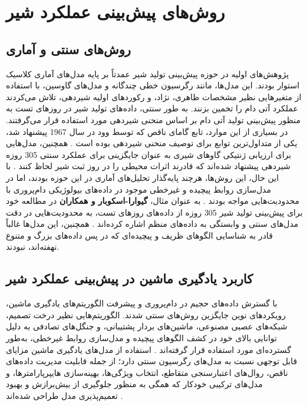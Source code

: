 \section{روش‌های پیش‌بینی عملکرد شیر}

\subsection{روش‌های سنتی و آماری}	
پژوهش‌های اولیه در حوزه پیش‌بینی تولید شیر عمدتاً بر پایه مدل‌های آماری کلاسیک استوار بودند. این مدل‌ها، مانند رگرسیون خطی چندگانه و مدل‌های گاوسین، با استفاده از متغیرهایی نظیر مشخصات ظاهری، نژاد، و رکوردهای اولیه شیردهی، تلاش می‌کردند عملکرد آتی دام را تخمین بزنند. به طور سنتی، داده‌های تولید شیر در روزهای تست به منظور پیش‌بینی تولید آتی دام بر اساس منحنی شیردهی مورد استفاده قرار می‌گرفتند. در بسیاری از این موارد، تابع گامای ناقص که توسط وود در سال 1967 پیشنهاد شد، یکی از متداول‌ترین توابع برای توصیف منحنی شیردهی بوده است \cite{Wood1967}. همچنین، مدل‌هایی برای ارزیابی ژنتیکی گاوهای شیری به عنوان جایگزینی برای عملکرد سنتی 305 روزه شیردهی پیشنهاد شده‌اند که قادرند اثرات محیطی را در روز ثبت شیر لحاظ کنند \cite{Ali1987}.
با این حال، این روش‌ها، هرچند پایه‌گذار تحلیل‌های آماری در این حوزه بودند، اما در مدل‌سازی روابط پیچیده و غیرخطی موجود در داده‌های بیولوژیکی دام‌پروری با محدودیت‌هایی مواجه بودند \cite{GuevaraEscobar2022}. به عنوان مثال، \textbf{ گیوارا-اسکوبار و همکاران} در مطالعه خود برای پیش‌بینی تولید شیر 305 روزه از داده‌های روزهای تست، به محدودیت‌هایی در دقت مدل‌های سنتی و وابستگی به داده‌های منظم اشاره کرده‌اند \cite{GuevaraEscobar2022}. همچنین، این مدل‌ها غالباً قادر به شناسایی الگوهای ظریف و پیچیده‌ای که در پس داده‌های بزرگ و متنوع نهفته‌اند، نبودند.
	
\subsection{کاربرد یادگیری ماشین در پیش‌بینی عملکرد شیر}	
با گسترش داده‌های حجیم در دام‌پروری و پیشرفت الگوریتم‌های یادگیری ماشین، رویکردهای نوین جایگزین روش‌های سنتی شدند. الگوریتم‌هایی نظیر درخت تصمیم، شبکه‌های عصبی مصنوعی، ماشین‌های بردار پشتیبانی، و جنگل‌های تصادفی به دلیل توانایی بالای خود در کشف الگوهای پیچیده و مدل‌سازی روابط غیرخطی، به‌طور گسترده‌ای مورد استفاده قرار گرفته‌اند \cite{GuevaraEscobar2022}. استفاده از مدل‌های یادگیری ماشین مزایای قابل توجهی نسبت به مدل‌های رگرسیون سنتی دارد؛ از جمله قابلیت مدیریت داده‌های ناقص، روال‌های اعتبارسنجی متقاطع، انتخاب ویژگی‌ها، بهینه‌سازی هایپرپارامترها، و مدل‌های ترکیبی خودکار که همگی به منظور جلوگیری از بیش‌برازش و بهبود تعمیم‌پذیری مدل طراحی شده‌اند \cite{GuevaraEscobar2022}.
	
